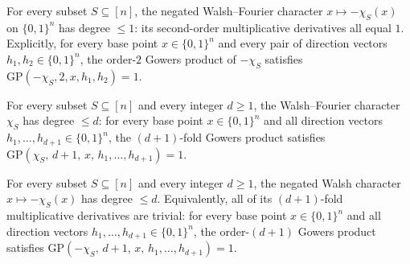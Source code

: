 \begin{lemma}
\label{LowDegreeTest.neg_char_is_degree_le_one}
\leanok
{}
For every subset $S \subseteq [n]$, the negated Walsh--Fourier character $x \mapsto
-\chi_S(x)$ on $\{0,1\}^n$ has degree $\le 1$: its second-order multiplicative
derivatives all equal $1$. Explicitly, for every base point $x \in \{0,1\}^n$ and every
pair of direction vectors $h_1, h_2 \in \{0,1\}^n$, the order-$2$ Gowers product of
$-\chi_S$ satisfies $\mathrm{GP}(-\chi_S, 2, x, h_1, h_2) = 1$.
\end{lemma}

\begin{lemma}
\label{LowDegreeTest.char_is_degree_le}
\leanok
{}
For every subset $S \subseteq [n]$ and every integer $d \ge 1$, the Walsh--Fourier
character $\chi_S$ has degree $\le d$: for every base point $x \in \{0,1\}^n$ and all
direction vectors $h_1, \ldots, h_{d+1} \in \{0,1\}^n$, the $(d{+}1)$-fold Gowers
product satisfies $\mathrm{GP}(\chi_S,\, d{+}1,\, x,\, h_1, \ldots, h_{d+1}) = 1$.
\end{lemma}

\begin{lemma}
\label{LowDegreeTest.neg_char_is_degree_le}
\leanok
{}
For every subset $S \subseteq [n]$ and every integer $d \ge 1$, the negated Walsh
character $x \mapsto -\chi_S(x)$ has degree $\le d$. Equivalently, all of its
$(d{+}1)$-fold multiplicative derivatives are trivial: for every base point $x \in
\{0,1\}^n$ and all direction vectors $h_1,\ldots,h_{d+1} \in \{0,1\}^n$, the
order-$(d{+}1)$ Gowers product satisfies $\mathrm{GP}(-\chi_S,\, d{+}1,\, x,\,
h_1,\ldots,h_{d+1}) = 1$.
\end{lemma}

